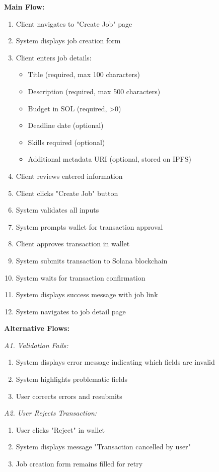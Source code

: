 \documentclass[a4paper,13pt,twoside]{report}
\theoremstyle{definition}
\begin{document}
\textbf{Main Flow:}
\begin{enumerate}
    \item Client navigates to "Create Job" page
    \item System displays job creation form
    \item Client enters job details:
    \begin{itemize}
        \item Title (required, max 100 characters)
        \item Description (required, max 500 characters)
        \item Budget in SOL (required, >0)
        \item Deadline date (optional)
        \item Skills required (optional)
        \item Additional metadata URI (optional, stored on IPFS)
    \end{itemize}
    \item Client reviews entered information
    \item Client clicks "Create Job" button
    \item System validates all inputs
    \item System prompts wallet for transaction approval
    \item Client approves transaction in wallet
    \item System submits transaction to Solana blockchain
    \item System waits for transaction confirmation
    \item System displays success message with job link
    \item System navigates to job detail page
\end{enumerate}

\textbf{Alternative Flows:}

\textit{A1. Validation Fails:}
\begin{enumerate}
    \item System displays error message indicating which fields are invalid
    \item System highlights problematic fields
    \item User corrects errors and resubmits
\end{enumerate}

\textit{A2. User Rejects Transaction:}
\begin{enumerate}
    \item User clicks "Reject" in wallet
    \item System displays message "Transaction cancelled by user"
    \item Job creation form remains filled for retry
\end{enumerate}
\end{document}
